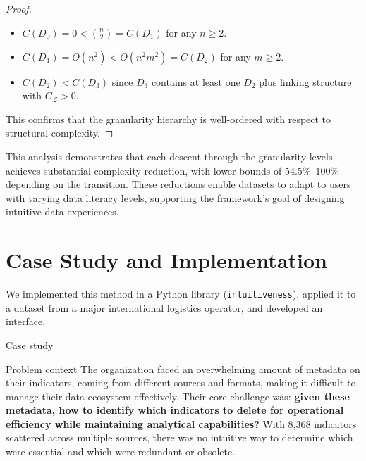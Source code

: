 \documentclass[]{hdsr}
\makeatletter
\def\subsection{\@startsection{subsection}{2}%
  \z@{.5\linespacing\@plus.7\linespacing}{.5\linespacing}%
  {\normalfont\bfseries}}
\def\subsubsection{\@startsection{subsubsection}{3}%
  \z@{.5\linespacing\@plus.7\linespacing}{.5\linespacing}%
  {\normalfont\bfseries}}
\theoremstyle{plain}      %
\theoremstyle{definition} %
\theoremstyle{remark}     %
\makeatother
\begin{document}
\begin{proof}
\begin{itemize}
    \item $C(D_0) = 0 < \binom{n}{2} = C(D_1)$ for any $n \geq 2$.
    \item $C(D_1) = O(n^2) < O(n^2 m^2) = C(D_2)$ for any $m \geq 2$.
    \item $C(D_2) < C(D_3)$ since $D_3$ contains at least one $D_2$ plus linking structure with $C_{\mathcal{L}} > 0$.
\end{itemize}
This confirms that the granularity hierarchy is well-ordered with respect to structural complexity.
\end{proof}

\noindent This analysis demonstrates that each descent through the granularity levels achieves substantial complexity reduction, with lower bounds of 54.5\%--100\% depending on the transition. These reductions enable datasets to adapt to users with varying data literacy levels, supporting the framework's goal of designing intuitive data experiences.


\section{Case Study and Implementation}
\label{sec:case-study}


We implemented this method in a Python library (\texttt{intuitiveness}), applied it to a dataset from a major international logistics operator, and developed an interface. 

\subsection{Case study}

\subsubsection{Problem context}
The organization faced an overwhelming amount of metadata on their indicators, coming from different sources and formats, making it difficult to manage their data ecosystem effectively. Their core challenge was: \textbf{given these metadata, how to identify which indicators to delete for operational efficiency while maintaining analytical capabilities?} With 8,368 indicators scattered across multiple sources, there was no intuitive way to determine which were essential and which were redundant or obsolete.
\end{document}
